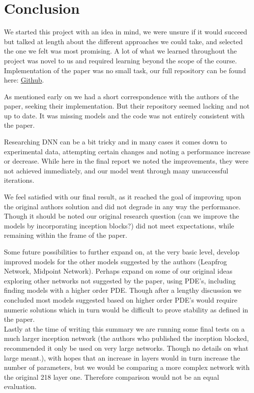 \documentclass{article}
\theoremstyle{remark}
\begin{document}
\section*{Conclusion}
We started this project with an idea in mind, we were unsure if it would succeed but talked at length about the different approaches we could take, and selected the one we felt was most 
promising. A lot of what we learned throughout the project was novel to us and required learning beyond the scope of the course. Implementation of the paper was no small task, our full 
repository can be found here: \href{https://github.com/nateRot/049064_variational_methods_in_image_processing/tree/main/final_project}{Github}. \par
As mentioned early on we had a short correspondence with the authors of the paper, seeking their implementation. But their repository seemed lacking and not up to date. It was missing 
models and the code was not entirely consistent with the paper. \par
Researching DNN can be a bit tricky and in many cases it comes down to experimental data, attempting certain changes and noting a performance increase or decrease. While here in the final 
report we noted the improvements, they were not achieved immediately, and our model went through many unsuccessful iterations. \par 
We feel satisfied with our final result, as it reached the goal of improving upon the original authors solution and did not degrade in any way the performance. Though it should be noted 
our original research question (can we improve the models by incorporating inception blocks?) did not meet expectations, while remaining within the frame of the paper.\par
Some future possibilities to further expand on, at the very basic level, develop improved models for the other models suggested by the authors (Leapfrog Network, Midpoint Network). Perhaps 
expand on some of our original ideas exploring other networks not suggested by the paper, using PDE's, including finding models with a higher order PDE. Though after a lengthy discussion 
we concluded most models suggested based on higher order PDE's would require numeric solutions which in turn would be difficult to prove stability as defined in the paper. \\
Lastly at the time of writing this summary we are running some final tests on a much larger inception network (the authors who published the inception blocked, recommended it only be used 
on very large networks. Though no details on what large meant.), with hopes that an increase in layers would in turn increase the number of parameters, but we would be comparing a more 
complex network with the original 218 layer one. Therefore comparison would not be an equal evaluation.
\end{document}

